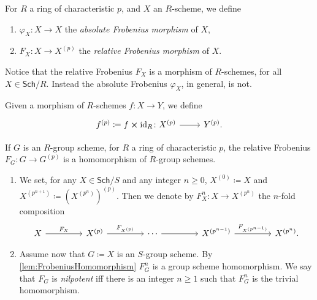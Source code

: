 \begin{defn}
	For $R$ a ring of characteristic $p$, and $X$ an $R$-scheme, we define
\begin{enumerate}
	\item $\varphi_X\colon X \to X$ the {\em absolute Frobenius morphism} of $X$,
	\item $F_X \colon X \to X^{(p)}$ the {\em relative Frobenius morphism} of $X$.
\end{enumerate}
\end{defn}


\begin{rem}[]
	Notice that the relative Frobenius $F_X$ is a
	morphism of $R$-schemes, for all $X \in \mathsf{Sch}/R$.
	Instead the absolute Frobenius $\varphi_X$, in general, is not.
\end{rem}


\begin{ntt}
	Given a morphism of $R$-schemes $f\colon X \to Y$,
	we define 
	\begin{equation}
	\begin{tikzcd}[row sep = 0ex
		,/tikz/column 1/.append style={anchor=base east}
		,/tikz/column 2/.append style={anchor=base west}]
		f^{(p)} \coloneqq f \cross \mathrm{id}_{ R }\colon 
		X^{(p)} \arrow[r, "", rightarrow] &
		Y^{(p)}
	.\end{tikzcd}
	\end{equation} 
\end{ntt}


\begin{lem}\label{lem:FrobeniusHomomorphism}
	If $G$ is an $R$-group scheme, for $R$ a ring of characteristic $p$,
	the relative Frobenius $F_G\colon G \to G^{(p)}$ is a 
	homomorphism of $R$-group schemes.
\end{lem} 


\begin{defn}\leavevmode\vspace{-1.2\baselineskip}\label{defn:nilpotentFrobenius}
\begin{enumerate}
\item We set, for any $X \in \mathsf{Sch}/S$ and any integer $n \geq 0$,
	$X^{(0)} \coloneqq X$ and $X^{(p^{n+1})} \coloneqq \left( X^{(p^{n})} \right)^{(p)}$.
	Then we denote by $F^n_X\colon X \to X^{(p^n)}$
	the $n$-fold composition
	\begin{equation}
	\begin{tikzcd}[column sep=4.3em]
		X \arrow[r, "F_X", rightarrow] &
		X^{(p)} \arrow[r, "F_{X^{(p)}}", rightarrow] &
		\cdots \arrow[r, "", rightarrow] &
		X^{(p^{n-1})} \arrow[r, "F_{X^{(p^{n-1})}}", rightarrow] &
		X^{(p^n)}
	.\end{tikzcd}
	\end{equation}
\item Assume now that $G \coloneqq X$ is an $S$-group scheme. 
	By \cref{lem:FrobeniusHomomorphism} $F^n_G$ is a group scheme homomorphism.
	We say that $F_G$ is {\em nilpotent} iff there is an integer $n \geq 1$ such that
	$F^n_G$ is the trivial homomorphism.
\end{enumerate}
\end{defn}



